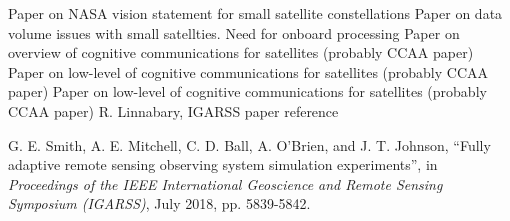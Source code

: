 \documentclass[conference]{IEEEtran}
\begin{document}
\begin{thebibliography}{9}
{\small
{} Paper on NASA vision statement for small satellite constellations
 Paper on data volume issues with small satellties.  Need for onboard processing
 Paper on overview of cognitive communications for satellites (probably CCAA paper)
 Paper on low-level of cognitive communications for satellites (probably CCAA paper)
 Paper on low-level of cognitive communications for satellites (probably CCAA paper)
 R. Linnabary, IGARSS paper reference

 G. E. Smith, A. E. Mitchell, C. D. Ball, A. O'Brien, and J. T. Johnson, ``Fully adaptive remote sensing observing system simulation experiments'', in {\it Proceedings of the IEEE International Geoscience and Remote Sensing Symposium (IGARSS)}, July 2018, pp. 5839-5842.
}
\end{thebibliography}
\end{document}
